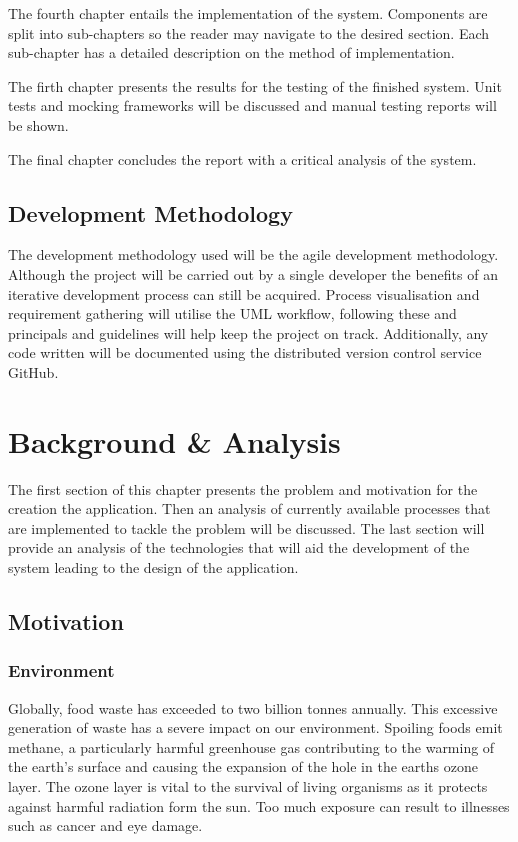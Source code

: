 \documentclass[a4paper, 11pt]{article}
\begin{document}
The fourth chapter entails the implementation of the system. Components are split into sub-chapters so the reader may navigate to the desired section. Each sub-chapter has a detailed description on the method of implementation.

The firth chapter presents the results for the testing of the finished system. Unit tests and mocking frameworks will be discussed and manual testing reports will be shown.

The final chapter concludes the report with a critical analysis of the system. 

\subsection{Development Methodology}
The development methodology used will be the agile development methodology\cite{agile}. Although the project will be carried out by a single developer the benefits of an iterative development process can still be acquired. Process visualisation and requirement gathering will utilise the UML workflow, following these and principals and guidelines will help keep the project on track. Additionally, any code written will be documented using the distributed version control service GitHub. 
\clearpage

\section{Background \& Analysis}
The first section of this chapter presents the problem and motivation for the creation the application. Then an analysis of currently available processes that are implemented to tackle the problem will be discussed. The last section will provide an analysis of the technologies that will aid the development of the system leading to the design of the application. 

\subsection{Motivation}
\subsubsection{Environment}
Globally, food waste has exceeded to two billion tonnes annually.\cite{waste} This excessive generation of waste has a severe impact on our environment. Spoiling foods emit methane, a particularly harmful greenhouse gas contributing to the warming of the earth's surface and causing the expansion of the hole in the earths ozone layer. The ozone layer is vital to the survival of living organisms as it protects against harmful radiation form the sun. Too much exposure can result to illnesses such as cancer and eye damage. 
\end{document}
